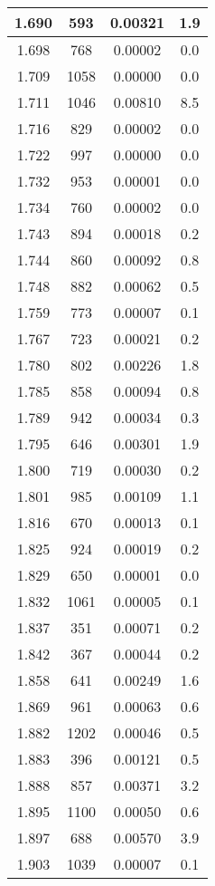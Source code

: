 \begin{longtable}{c | c | c | c}
1.690 &  593 & 0.00321 &  1.9 \\ \hline 
1.698 &  768 & 0.00002 &  0.0 \\ \hline 
1.709 & 1058 & 0.00000 &  0.0 \\ \hline 
1.711 & 1046 & 0.00810 &  8.5 \\ \hline 
1.716 &  829 & 0.00002 &  0.0 \\ \hline 
1.722 &  997 & 0.00000 &  0.0 \\ \hline 
1.732 &  953 & 0.00001 &  0.0 \\ \hline 
1.734 &  760 & 0.00002 &  0.0 \\ \hline 
1.743 &  894 & 0.00018 &  0.2 \\ \hline 
1.744 &  860 & 0.00092 &  0.8 \\ \hline 
1.748 &  882 & 0.00062 &  0.5 \\ \hline 
1.759 &  773 & 0.00007 &  0.1 \\ \hline 
1.767 &  723 & 0.00021 &  0.2 \\ \hline 
1.780 &  802 & 0.00226 &  1.8 \\ \hline 
1.785 &  858 & 0.00094 &  0.8 \\ \hline 
1.789 &  942 & 0.00034 &  0.3 \\ \hline 
1.795 &  646 & 0.00301 &  1.9 \\ \hline 
1.800 &  719 & 0.00030 &  0.2 \\ \hline 
1.801 &  985 & 0.00109 &  1.1 \\ \hline 
1.816 &  670 & 0.00013 &  0.1 \\ \hline 
1.825 &  924 & 0.00019 &  0.2 \\ \hline 
1.829 &  650 & 0.00001 &  0.0 \\ \hline 
1.832 & 1061 & 0.00005 &  0.1 \\ \hline 
1.837 &  351 & 0.00071 &  0.2 \\ \hline 
1.842 &  367 & 0.00044 &  0.2 \\ \hline 
1.858 &  641 & 0.00249 &  1.6 \\ \hline 
1.869 &  961 & 0.00063 &  0.6 \\ \hline 
1.882 & 1202 & 0.00046 &  0.5 \\ \hline 
1.883 &  396 & 0.00121 &  0.5 \\ \hline 
1.888 &  857 & 0.00371 &  3.2 \\ \hline 
1.895 & 1100 & 0.00050 &  0.6 \\ \hline 
1.897 &  688 & 0.00570 &  3.9 \\ \hline 
1.903 & 1039 & 0.00007 &  0.1 \\ \hline 

\end{longtable}
